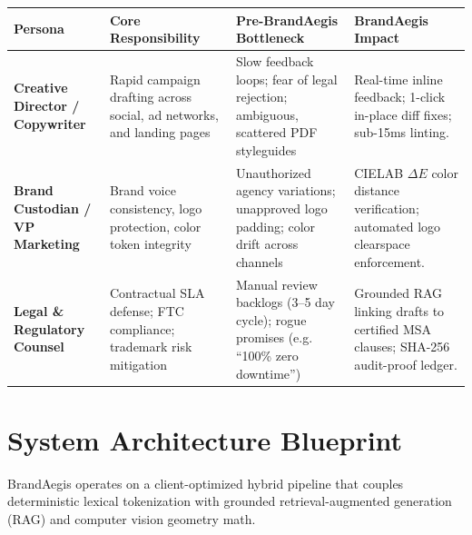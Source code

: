 \documentclass[10pt,a4paper]{article}
\begin{document}
\begin{center}
\footnotesize
\begin{tabularx}{\textwidth}{p{2.5cm}p{3.8cm}p{4.2cm}X}
\toprule
\textbf{Persona} & \textbf{Core Responsibility} & \textbf{Pre-BrandAegis Bottleneck} & \textbf{BrandAegis Impact} \\
\midrule
\textbf{Creative Director / Copywriter} & Rapid campaign drafting across social, ad networks, and landing pages & Slow feedback loops; fear of legal rejection; ambiguous, scattered PDF styleguides & Real-time inline feedback; 1-click in-place diff fixes; sub-15ms linting. \\
\addlinespace[0.1cm]
\textbf{Brand Custodian / VP Marketing} & Brand voice consistency, logo protection, color token integrity & Unauthorized agency variations; unapproved logo padding; color drift across channels & CIELAB $\Delta E$ color distance verification; automated logo clearspace enforcement. \\
\addlinespace[0.1cm]
\textbf{Legal \& Regulatory Counsel} & Contractual SLA defense; FTC compliance; trademark risk mitigation & Manual review backlogs (3--5 day cycle); rogue promises (e.g. ``100\% zero downtime'') & Grounded RAG linking drafts to certified MSA clauses; SHA-256 audit-proof ledger. \\
\bottomrule
\end{tabularx}
\end{center}

\vspace{-0.25cm}
\section{System Architecture Blueprint}
BrandAegis operates on a client-optimized hybrid pipeline that couples deterministic lexical tokenization with grounded retrieval-augmented generation (RAG) and computer vision geometry math.
\end{document}
